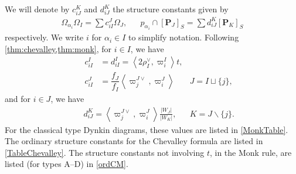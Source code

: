 \documentclass[10pt]{article}
\numberwithin{thm}{section}
\theoremstyle{definition}
\theoremstyle{remark}
\newcommand{\Pet}{\ensuremath{\mathbf{P}}}
\begin{document}

We will denote by $c_{iJ}^K$ and $d_{iJ}^K$ the structure constants given by
\begin{align*}
\Omega_{\alpha_i}\Omega_I=\sum c_{iI}^J\Omega_J,&&
p_{\alpha_i}\cap[\Pet_J]_S=\sum d_{iJ}^K[\Pet_K]_S
\end{align*}
respectively. We write $i$ for $\alpha_i\in I$ to simplify notation.
Following \cref{thm:chevalley,thm:monk}, for $i\in I$, we have
\begin{align*}
&&c_{iI}^I & =d_{iI}^I =\left\langle2\rho_I^\vee,\varpi^I_i\right\rangle t,         & \\
&&c_{iI}^J & = \dfrac{f_J}{f_I}\left\langle\varpi_j^{J\vee},\varpi^J_i\right\rangle & J=I\sqcup\{j\},
\end{align*}
and for $i\in J$, we have
\begin{align*}
&&d_{iJ}^K=\left\langle\varpi^{J\vee}_j,\varpi^J_i\right\rangle \frac{|W_J|}{|W_K|},&&  K=J\backslash\{j\}.
\end{align*}
For the classical type Dynkin diagrams, these values are listed in \cref{MonkTable}.
The ordinary structure constants for the Chevalley formula are listed in \cref{TableChevalley}.
The structure constants not involving $t$, in the Monk rule, are listed (for types A--D) in \cref{ordCM}.
%
\end{document}
